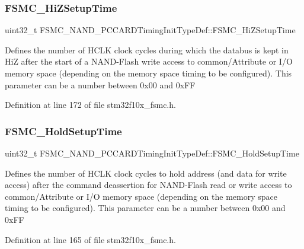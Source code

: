 \subsubsection{\texorpdfstring{F\+S\+M\+C\+\_\+\+Hi\+Z\+Setup\+Time}{FSMC\_HiZSetupTime}}
{\footnotesize\ttfamily uint32\+\_\+t F\+S\+M\+C\+\_\+\+N\+A\+N\+D\+\_\+\+P\+C\+C\+A\+R\+D\+Timing\+Init\+Type\+Def\+::\+F\+S\+M\+C\+\_\+\+Hi\+Z\+Setup\+Time}

Defines the number of H\+C\+LK clock cycles during which the databus is kept in HiZ after the start of a N\+A\+N\+D-\/\+Flash write access to common/\+Attribute or I/O memory space (depending on the memory space timing to be configured). This parameter can be a number between 0x00 and 0x\+FF 

Definition at line 172 of file stm32f10x\+\_\+fsmc.\+h.

\mbox{\label{struct_f_s_m_c___n_a_n_d___p_c_c_a_r_d_timing_init_type_def_ae2b53c2cfd55ff277f453613dcf7c8b2}} 
\subsubsection{\texorpdfstring{F\+S\+M\+C\+\_\+\+Hold\+Setup\+Time}{FSMC\_HoldSetupTime}}
{\footnotesize\ttfamily uint32\+\_\+t F\+S\+M\+C\+\_\+\+N\+A\+N\+D\+\_\+\+P\+C\+C\+A\+R\+D\+Timing\+Init\+Type\+Def\+::\+F\+S\+M\+C\+\_\+\+Hold\+Setup\+Time}

Defines the number of H\+C\+LK clock cycles to hold address (and data for write access) after the command deassertion for N\+A\+N\+D-\/\+Flash read or write access to common/\+Attribute or I/O memory space (depending on the memory space timing to be configured). This parameter can be a number between 0x00 and 0x\+FF 

Definition at line 165 of file stm32f10x\+\_\+fsmc.\+h.

\mbox{\label{struct_f_s_m_c___n_a_n_d___p_c_c_a_r_d_timing_init_type_def_a31632aeb49269a29a39e3b191590b6dc}} 
